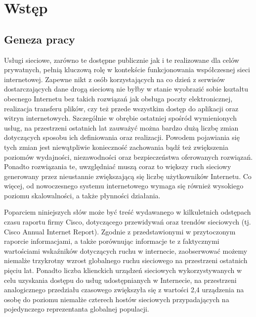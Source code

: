 \chapter{Wstęp}
\section{Geneza pracy}
Usługi sieciowe, zarówno te dostępne publicznie jak i te realizowane dla celów prywatnych, pełnią kluczową rolę w kontekście funkcjonowania współczesnej sieci internetowej. Zapewne nikt z osób korzystających na co dzień z serwisów dostarczających dane drogą sieciową nie byłby w stanie wyobrazić sobie kształtu obecnego Internetu bez takich rozwiązań jak obsługa poczty elektronicznej, realizacja transferu plików, czy też przede wszystkim dostęp do aplikacji oraz witryn internetowych. Szczególnie w obrębie ostatniej spośród wymienionych usług, na przestrzeni ostatnich lat zauważyć można bardzo dużą liczbę zmian dotyczących sposobu ich definiowania oraz realizacji. Powodem pojawiania się tych zmian jest niewątpliwie konieczność zachowania bądź też zwiększenia poziomów wydajności, niezawodności oraz bezpieczeństwa oferowanych rozwiązań. Ponadto rozwiązania te, uwzględniać muszą coraz to większy ruch sieciowy generowany przez nieustannie zwiększającą się liczbę użytkowników Internetu. Co więcej, od nowoczesnego systemu internetowego wymaga się również wysokiego poziomu skalowalności, a także płynności działania.

Poparciem niniejszych słów może być treść wydawanego w kilkuletnich odstępach czasu raportu firmy Cisco, dotyczącego przewidywań oraz trendów sieciowych (tj. Cisco Annual Internet Report). Zgodnie z przedstawionymi w przytoczonym raporcie informacjami, a także porównując informacje te z faktycznymi wartościami wskaźników dotyczących ruchu w internecie, zaobserwować możemy niemalże trzykrotny wzrost globalnego ruchu sieciowego na przestrzeni ostatnich pięciu lat. Ponadto liczba klienckich urządzeń sieciowych wykorzystywanych w celu uzyskania dostępu do usług udostępnianych w Internecie, na przestrzeni analogicznego przedziału czasowego zwiększyła się z wartości 2,4 urządzenia na osobę do poziomu niemalże czterech hostów sieciowych przypadających na pojedynczego reprezentanta globalnej populacji.

